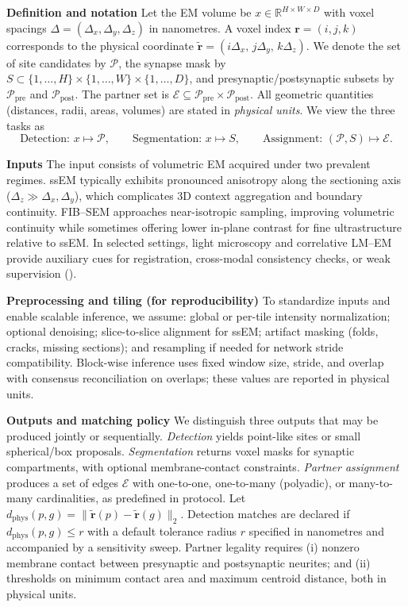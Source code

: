 \medskip
\noindent\textbf{Definition and notation}\;
Let the EM volume be \(x \in \mathbb{R}^{H \times W \times D}\) with voxel spacings \(\Delta=(\Delta_x,\Delta_y,\Delta_z)\) in nanometres.
A voxel index \(\mathbf r=(i,j,k)\) corresponds to the physical coordinate \(\tilde{\mathbf r}=(i\Delta_x,\,j\Delta_y,\,k\Delta_z)\).
We denote the set of site candidates by \(\mathcal P\), the synapse mask by \(S \subset \{1,\dots,H\}\times\{1,\dots,W\}\times\{1,\dots,D\}\), and presynaptic/postsynaptic subsets by \(\mathcal P_{\mathrm{pre}}\) and \(\mathcal P_{\mathrm{post}}\).
The partner set is \(\mathcal E \subseteq \mathcal P_{\mathrm{pre}}\times \mathcal P_{\mathrm{post}}\).
All geometric quantities (distances, radii, areas, volumes) are stated in \emph{physical units}.
We view the three tasks as
\[
\text{Detection: } x \mapsto \mathcal P,\qquad
\text{Segmentation: } x \mapsto S,\qquad
\text{Assignment: } (\mathcal P,S) \mapsto \mathcal E.
\]\par

\medskip
\noindent\textbf{Inputs}\;
The input consists of volumetric EM acquired under two prevalent regimes.
ssEM typically exhibits pronounced anisotropy along the sectioning axis (\(\Delta_z \gg \Delta_x,\Delta_y\)), which complicates 3D context aggregation and boundary continuity.
FIB--SEM approaches near-isotropic sampling, improving volumetric continuity while sometimes offering lower in-plane contrast for fine ultrastructure relative to ssEM.
In selected settings, light microscopy and correlative LM--EM provide auxiliary cues for registration, cross-modal consistency checks, or weak supervision (\cite{Simhal2017PCBiol}).\par

\medskip
\noindent\textbf{Preprocessing and tiling (for reproducibility)}\;
To standardize inputs and enable scalable inference, we assume: global or per-tile intensity normalization; optional denoising; slice-to-slice alignment for ssEM; artifact masking (folds, cracks, missing sections); and resampling if needed for network stride compatibility.
Block-wise inference uses fixed window size, stride, and overlap with consensus reconciliation on overlaps; these values are reported in physical units.\par

\medskip
\noindent\textbf{Outputs and matching policy}\;
We distinguish three outputs that may be produced jointly or sequentially.
\emph{Detection} yields point-like sites or small spherical/box proposals.
\emph{Segmentation} returns voxel masks for synaptic compartments, with optional membrane-contact constraints.
\emph{Partner assignment} produces a set of edges \(\mathcal E\) with one-to-one, one-to-many (polyadic), or many-to-many cardinalities, as predefined in protocol.
Let \( d_{\mathrm{phys}}(p,g)=\|\tilde{\mathbf r}(p)-\tilde{\mathbf r}(g)\|_2 \).
Detection matches are declared if \(d_{\mathrm{phys}}(p,g)\le r\) with a default tolerance radius \(r\) specified in nanometres and accompanied by a sensitivity sweep.
Partner legality requires (i) nonzero membrane contact between presynaptic and postsynaptic neurites; and (ii) thresholds on minimum contact area and maximum centroid distance, both in physical units.\par

